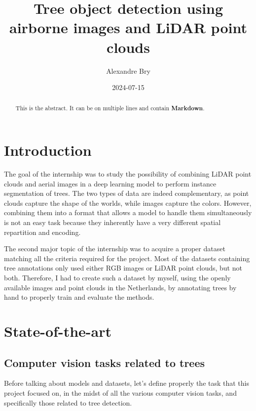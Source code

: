 \documentclass[
]{report}
\title{Tree object detection using airborne images and LiDAR point
clouds}
\author{Alexandre Bry}
\date{2024-07-15}
\renewcommand*\contentsname{Table of contents}
\newcommand\contentsname{Table of contents}
\begin{document}
\maketitle
\begin{abstract}
This is the abstract. It can be on multiple lines and contain
\textbf{Markdown}.
\end{abstract}

\renewcommand*\contentsname{Table of contents}
{
\hypersetup{linkcolor=}
\setcounter{tocdepth}{2}
\tableofcontents
}

\chapter{Introduction}\label{introduction}

The goal of the internship was to study the possibility of combining
LiDAR point clouds and aerial images in a deep learning model to perform
instance segmentation of trees. The two types of data are indeed
complementary, as point clouds capture the shape of the worlds, while
images capture the colors. However, combining them into a format that
allows a model to handle them simultaneously is not an easy task because
they inherently have a very different spatial repartition and encoding.

The second major topic of the internship was to acquire a proper dataset
matching all the criteria required for the project. Most of the datasets
containing tree annotations only used either RGB images or LiDAR point
clouds, but not both. Therefore, I had to create such a dataset by
myself, using the openly available images and point clouds in the
Netherlands, by annotating trees by hand to properly train and evaluate
the methods.

\chapter{State-of-the-art}\label{state-of-the-art}

\section{Computer vision tasks related to
trees}\label{computer-vision-tasks-related-to-trees}

Before talking about models and datasets, let's define properly the task
that this project focused on, in the midst of all the various computer
vision tasks, and specifically those related to tree detection.
\end{document}
